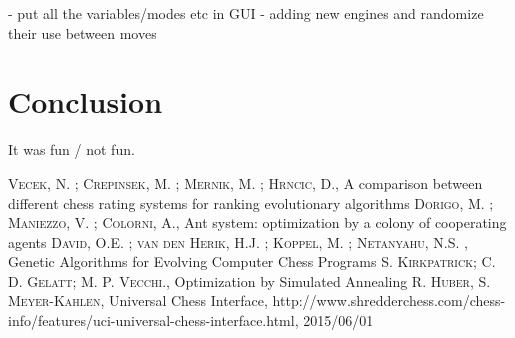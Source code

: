 \documentclass[pdftex]{article}
\begin{document}
 - put all the variables/modes etc in GUI
 - adding new engines and randomize their use between moves


\section{Conclusion}
\label{sec:conclusion}


It was fun / not fun.

\begin{thebibliography}{99}

 \textsc{Vecek, N. ; Crepinsek, M. ; Mernik, M. ; Hrncic, D.}, A comparison between different chess rating systems for ranking evolutionary algorithms 
 \textsc{Dorigo, M. ; Maniezzo, V. ; Colorni, A.}, Ant system: optimization by a colony of cooperating agents 
 \textsc{David, O.E. ; van den Herik, H.J. ; Koppel, M. ; Netanyahu, N.S. }, Genetic Algorithms for Evolving Computer Chess Programs 
 \textsc{S. Kirkpatrick; C. D. Gelatt; M. P. Vecchi.}, Optimization by Simulated Annealing 
 \textsc{R. Huber, S. Meyer-Kahlen}, Universal Chess Interface, http://www.shredderchess.com/chess-info/features/uci-universal-chess-interface.html, 2015/06/01

\end{thebibliography}
\end{document}
